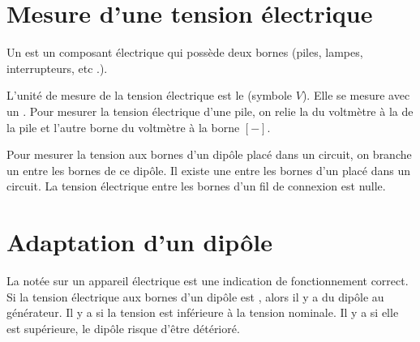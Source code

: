 \documentclass[12pt,a4paper]{article}
\begin{document}
	
	

\section{Mesure d'une tension électrique}

\begin{myrap}
	Un  est un composant électrique qui possède deux bornes (piles, lampes, interrupteurs, etc .).
\end{myrap}


\begin{mybilan}
	L'unité de mesure de la tension électrique est le  (symbole $V$). Elle se mesure avec un .
	Pour mesurer la tension électrique d'une pile, on relie la  du voltmètre à la  de la pile et l'autre borne du voltmètre à la borne $[-]$.
	
	Pour mesurer la tension aux bornes d'un dipôle placé dans un circuit, on branche un  entre les bornes de ce dipôle. Il existe une  entre les bornes d'un  placé dans un circuit.
	La tension électrique entre les bornes d'un fil de connexion est nulle.
\end{mybilan}

\begin{myexos}
\end{myexos}


\section{Adaptation d'un dipôle}

\begin{mybilan}
	La  notée sur un appareil électrique est une indication de fonctionnement correct.
	Si la tension électrique aux bornes d'un dipôle est , alors il y a  du dipôle au générateur. 
	Il y a  si la tension est inférieure à la tension nominale. Il y a  si elle est supérieure, le dipôle risque d'être détérioré. 
\end{mybilan}
\end{document}
